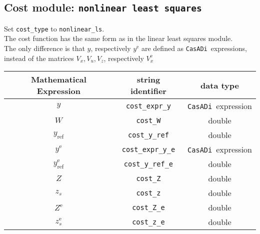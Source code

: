 \documentclass{article}
\newcommand{\code}[1]{\texttt{#1}}
\newcommand{\casadi}{\texttt{CasADi}}
\newcommand{\terminal}{^{\textrm{e}}}
\begin{document}
\newpage
\subsection*{Cost module: \code{nonlinear least squares}}
Set \code{cost\_type} to \code{nonlinear\_ls}.\\
The cost function has the same form as in the linear least squares module.\\
The only difference is that $ y $, respectively $ y\terminal $ are defined as \casadi~expressions, instead of the matrices $ V_x, V_u, V_z $, respectively $ V_x\terminal $

\begin{table}[h!]
	\centering
	\begin{tabular}{|c|c|c|}
		\toprule
		Mathematical Expression                    & string identifier & data type \\ \midrule
		$ y $ & \code{cost\_expr\_y}    & \casadi~expression    \\ \midrule
		$ W $ & \code{cost\_W}    & double    \\ \midrule
		$ y_{\textrm{ref}} $ & \code{cost\_y\_ref}    & double    \\ \midrule
		$ y\terminal $ & \code{cost\_expr\_y\_e}    & \casadi~expression    \\ \midrule
		$ y_{\textrm{ref}}\terminal $ & \code{cost\_y\_ref\_e}    & double    \\ \midrule
		$ Z $ & \code{cost\_Z}    & double    \\ \midrule
		$ z_s $ & \code{cost\_z}    & double    \\ \midrule
		$ Z\terminal $ & \code{cost\_Z\_e}    & double    \\ \midrule
		$ z_s\terminal $ & \code{cost\_z\_e}    & double    \\
		\bottomrule
	\end{tabular}
\end{table}
\newpage
\end{document}
